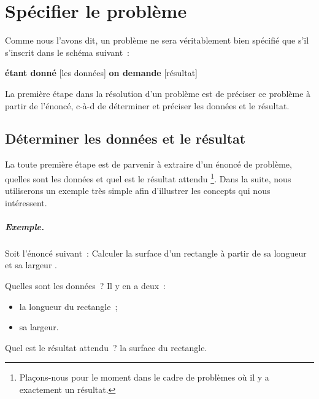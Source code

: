 \chapter{Spécifier le problème}

	Comme nous l’avons dit, 
	un problème ne sera véritablement bien spécifié 
	que s’il s’inscrit dans le schéma suivant~:
		
	\medskip
	\begin{center}
	\begin{Ovalbox}
		{\textbf{étant donné} [les données] 
		\textbf{on demande} [résultat]}
	\end{Ovalbox}
	\end{center}
	\medskip
	
	La première étape dans la résolution d’un problème est de
	préciser ce problème à partir de l’énoncé,
	c-à-d de déterminer et préciser les données et le résultat.
	
	\minitoc

	\section{Déterminer les données et le résultat}
	
		La toute première étape est de parvenir à extraire
		d’un énoncé de problème, quelles sont les données
		et quel est le résultat attendu%
		\footnote{%
			Plaçons-nous pour le moment dans le cadre
			de problèmes où il y a exactement un résultat.%
		}. Dans la suite, nous utiliserons un exemple très simple afin 
		d'illustrer les concepts qui nous intéressent. 
	
		\clearpage
		\vspace{1cm}
	
		\begin{Emphase}
			\paragraph{Exemple.}
			Soit l’énoncé suivant~:
			\og
				Calculer la surface d’un rectangle 
				à partir de sa longueur et sa largeur
			\fg.
			
			Quelles sont les données~? Il y en a deux~:	
			\begin{itemize}
				\item la longueur du rectangle~;
				\item sa largeur.
			\end{itemize}
		
			Quel est le résultat attendu~? la surface du rectangle.
		\end{Emphase}
		

